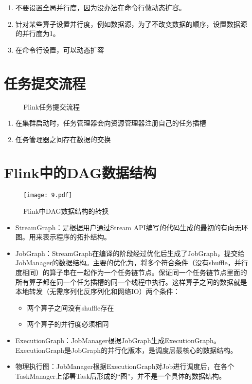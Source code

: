 \documentclass[cn,11pt,chinese]{elegantbook}
\begin{document}
\begin{enumerate}
  \item 不要设置全局并行度，因为没办法在命令行做动态扩容。
  \item 针对某些算子设置并行度，例如数据源，为了不改变数据的顺序，设置数据源的并行度为1。
  \item 在命令行设置，可以动态扩容
\end{enumerate}

\section{任务提交流程}

\begin{figure}[htbp]
  \centering
  
  \caption{Flink任务提交流程}
\end{figure}

\begin{enumerate}
  \item 在集群启动时，任务管理器会向资源管理器注册自己的任务插槽
  \item 任务管理器之间存在数据的交换
\end{enumerate}

\section{Flink中的DAG数据结构}

\begin{figure}[htbp]
  \centering
  \texttt{[image: 9.pdf]}
  \caption{Flink中DAG数据结构的转换}
\end{figure}

\begin{itemize}
  \item StreamGraph：是根据用户通过Stream API编写的代码生成的最初的有向无环图。用来表示程序的拓扑结构。
  \item JobGraph：StreamGraph在编译的阶段经过优化后生成了JobGraph，提交给 JobManager的数据结构。主要的优化为，将多个符合条件（没有shuffle，并行度相同）的算子串在一起作为一个任务链节点。保证同一个任务链节点里面的所有算子都在同一个任务插槽的同一个线程中执行。这样算子之间的数据就是本地转发（无需序列化反序列化和网络IO）两个条件：
    \begin{itemize}
      \item 两个算子之间没有shuffle存在
      \item 两个算子的并行度必须相同
    \end{itemize}
  \item ExecutionGraph：JobManager根据JobGraph生成ExecutionGraph。ExecutionGraph是JobGraph的并行化版本，是调度层最核心的数据结构。
  \item 物理执行图：JobManager根据ExecutionGraph对Job进行调度后，在各个 TaskManager上部署Task后形成的“图”，并不是一个具体的数据结构。
\end{itemize}
\end{document}
